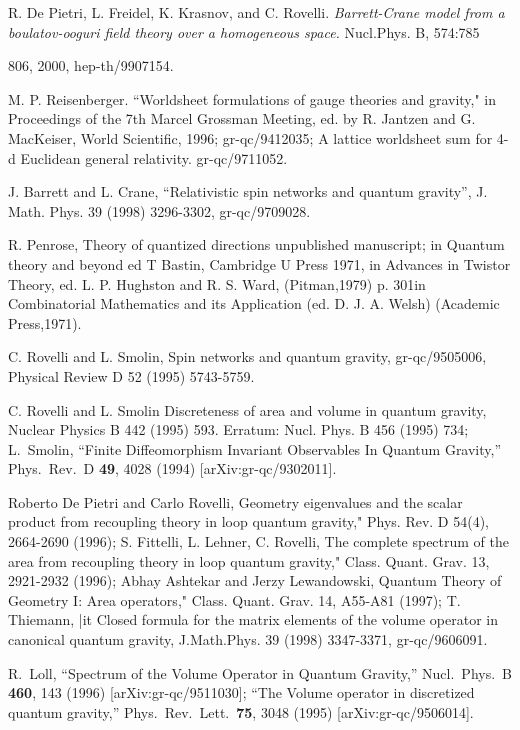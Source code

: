 \documentclass[12pt]{article}
\begin{document}
\begin{thebibliography}{0}
{{R. De Pietri, L. Freidel,
K. Krasnov, and C. Rovelli. {\it Barrett-Crane
model from a boulatov-ooguri field theory over a homogeneous space.}
Nucl.Phys. B, 574:785{806, 2000, hep-th/9907154.

M. P. Reisenberger.
``Worldsheet formulations of gauge theories and gravity,"
in Proceedings of the 7th Marcel Grossman Meeting, ed. by R.
Jantzen and G. MacKeiser, World Scientific, 1996; gr-qc/9412035;
A lattice worldsheet sum for 4-d Euclidean general
relativity. gr-qc/9711052.

J. Barrett and L. Crane, ``Relativistic spin networks and
quantum gravity'', J. Math. Phys.
39 (1998) 3296-3302, gr-qc/9709028.

R. Penrose, Theory of quantized directions unpublished
manuscript;
in Quantum theory and beyond ed T Bastin, Cambridge U Press
1971, in
Advances in Twistor Theory, ed. L. P. Hughston and R. S. Ward, (Pitman,1979) p.
301in Combinatorial
Mathematics and its Application (ed. D. J. A. Welsh) (Academic Press,1971).

C. Rovelli and L. Smolin, Spin networks and quantum gravity,
gr-qc/9505006, Physical
Review D 52 (1995) 5743-5759.

C. Rovelli and L. Smolin Discreteness of area and volume in
quantum gravity, Nuclear
Physics B 442 (1995) 593. Erratum: Nucl. Phys. B 456 (1995) 734;
L.~Smolin,
``Finite Diffeomorphism Invariant Observables In Quantum Gravity,''
Phys.\ Rev.\ D {\bf 49}, 4028 (1994)
[arXiv:gr-qc/9302011].

Roberto De Pietri and Carlo Rovelli, Geometry eigenvalues
and the scalar product from
recoupling theory in loop quantum gravity," Phys. Rev. D 54(4),
2664-2690 (1996);
 S. Fittelli, L. Lehner, C. Rovelli, The complete spectrum of the
 area from recoupling
theory in loop quantum gravity," Class. Quant. Grav. 13, 2921-2932 (1996);
Abhay Ashtekar and Jerzy Lewandowski, Quantum Theory of Geometry I:
Area operators,"
Class. Quant. Grav. 14, A55-A81 (1997);  T. Thiemann, 
{|it Closed formula for the matrix elements of the volume operator in canonical quantum gravity}, J.Math.Phys. 39 (1998) 3347-3371, 
 gr-qc/9606091.

R.~Loll,
``Spectrum of the Volume Operator in Quantum Gravity,''
Nucl.\ Phys.\ B {\bf 460}, 143 (1996)
[arXiv:gr-qc/9511030];
``The Volume operator in discretized quantum gravity,''
Phys.\ Rev.\ Lett.\  {\bf 75}, 3048 (1995)
[arXiv:gr-qc/9506014].

}}}
\end{thebibliography}
\end{document}
